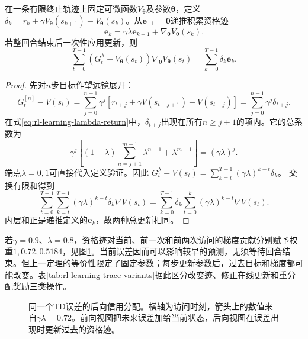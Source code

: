 \begin{theorem}[固定参数下前后向更新等价]
  \label{thm:rl-learning-trace-equivalence}
  在一条有限终止轨迹上固定可微函数$V_{\bm{\theta}}$及参数$\bm{\theta}$，定义$\delta_k=r_k+\gamma V_{\bm{\theta}}(s_{k+1})-V_{\bm{\theta}}(s_k)$。从$\bm{e}_{-1}=\bm{0}$递推积累资格迹
  \[
    \bm{e}_k=\gamma\lambda\bm{e}_{k-1}
                    +\nabla_{\bm{\theta}}V_{\bm{\theta}}(s_k).
  \]
  若整回合结束后一次性应用更新，则
  \begin{equation}
    \sum_{t=0}^{T-1}
      (G_t^\lambda-V_{\bm{\theta}}(s_t))
      \nabla_{\bm{\theta}}V_{\bm{\theta}}(s_t)
      =\sum_{k=0}^{T-1}\delta_k\bm{e}_k .
    \label{eq:rl-learning-trace-equivalence}
  \end{equation}
\end{theorem}
\begin{proof}
  先对$n$步目标作望远镜展开：
  \[
    G_t^{[n]}-V(s_t)
       =\sum_{j=0}^{n-1}\gamma^j
          [r_{t+j}+\gamma V(s_{t+j+1})-V(s_{t+j})]
       =\sum_{j=0}^{n-1}\gamma^j\delta_{t+j}.
  \]
  在式\eqref{eq:rl-learning-lambda-return}中，$\delta_{t+j}$出现在所有$n\geq j+1$的项内。它的总系数为
  \[
    \gamma^j\left[(1-\lambda)
       \sum_{n=j+1}^{m-1}\lambda^{n-1}
       +\lambda^{m-1}\right]=(\gamma\lambda)^j.
  \]
  端点$\lambda=0,1$可直接代入定义验证。因此
  $G_t^\lambda-V(s_t)=\sum_{k=t}^{T-1}(\gamma\lambda)^{k-t}\delta_k$。
  交换有限和得到
  \[
    \sum_{t=0}^{T-1}\sum_{k=t}^{T-1}
       (\gamma\lambda)^{k-t}\delta_k\nabla V(s_t)
    =
    \sum_{k=0}^{T-1}\delta_k
       \sum_{t=0}^k(\gamma\lambda)^{k-t}\nabla V(s_t).
  \]
  内层和正是递推定义的$\bm{e}_k$，故两种总更新相同。
\end{proof}

若$\gamma=0.9$、$\lambda=0.8$，资格迹对当前、前一次和前两次访问的梯度贡献分别赋予权重$1,0.72,0.5184$，见图\ref{fig:rl-learning-traces}。当前误差因而可以影响较早的预测，无须等待回合结束。但上一定理的等价性限定了固定参数；每步更新参数后，过去目标和梯度都可能改变。表\ref{tab:rl-learning-trace-variants}据此区分改变迹、修正在线更新和重分配奖励三类操作。

\begin{figure}[htbp]
  \centering
  
  \caption{同一个TD误差的后向信用分配。横轴为访问时刻，箭头上的数值来自$\gamma\lambda=0.72$。前向视图把未来误差加给当前状态，后向视图在误差出现时更新过去的资格迹。}
  \label{fig:rl-learning-traces}
\end{figure}

